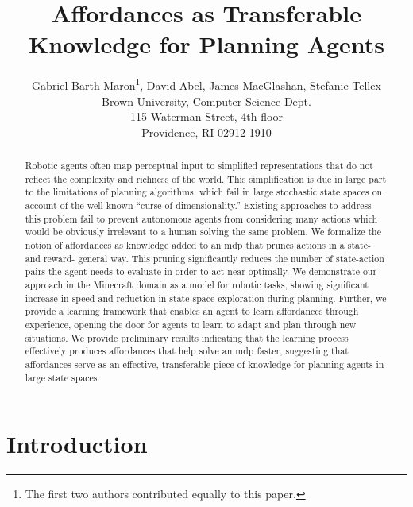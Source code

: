 \documentclass[letterpaper]{article}
\newcommand*\samethanks[1][\value{footnote}]{\footnotemark[#1]}
\begin{document}

\title{Affordances as Transferable Knowledge for Planning Agents}
\author{Gabriel Barth-Maron\thanks{The first two authors contributed equally to this paper.}, David Abel\samethanks, James MacGlashan, Stefanie Tellex\\
Brown University, Computer Science Dept. \\
115 Waterman Street, 4th floor \\
Providence, RI 02912-1910}


\maketitle
\begin{abstract}
Robotic agents often map perceptual input to simplified
representations that do not reflect the complexity and richness of the
world. This simplification is due in large part to the limitations of
planning algorithms, which fail in large stochastic state spaces on
account of the well-known ``curse of dimensionality.''  Existing
approaches to address this problem fail to prevent autonomous agents
from considering many actions which would be obviously irrelevant to a
human solving the same problem. We formalize the notion of affordances
as knowledge added to an \gls{mdp} that prunes actions in a state- and
reward- general way. This pruning significantly reduces the number of
state-action pairs the agent needs to evaluate in order to act
near-optimally. We demonstrate our approach in the Minecraft domain as a
model for robotic tasks, showing significant increase in speed and
reduction in state-space exploration during planning. Further, we
provide a learning framework that enables an agent to learn
affordances through experience, opening the door for agents to learn
to adapt and plan through new situations. We provide preliminary
results indicating that the learning process effectively produces
affordances that help solve an \gls{mdp} faster, suggesting that affordances
serve as an effective, transferable piece of knowledge for planning
agents in large state spaces.
\end{abstract}


\section{Introduction}
\label{sec:introduction}
\end{document}
